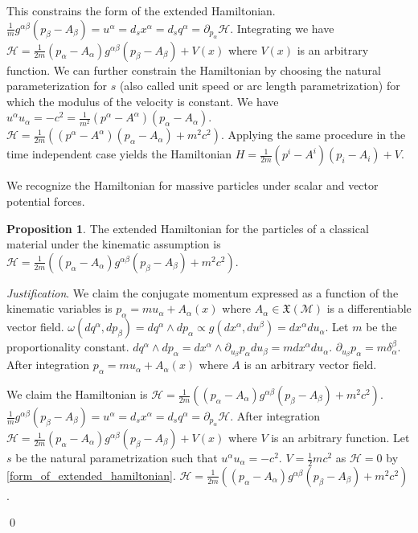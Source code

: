 \documentclass[aps,pra,10pt,twocolumn,floatfix,nofootinbib]{revtex4-1}
\numberwithin{equation}{section}
\theoremstyle{definition}
\newtheorem{prop}[equation]{Proposition}
\newenvironment{justification}{\emph{Justification}.}{\qed}
\begin{document}
This constrains the form of the extended Hamiltonian. $\frac{1}{m}g^{\alpha\beta}(p_\beta-A_\beta) = u^\alpha = d_s x^\alpha = d_s q^\alpha = \partial_{p_\alpha} \mathcal{H}$. Integrating we have $\mathcal{H}=\frac{1}{2m}(p_\alpha-A_\alpha)g^{\alpha\beta}(p_\beta-A_\beta)+V(x)$ where $V(x)$ is an arbitrary function. We can further constrain the Hamiltonian by choosing the natural parameterization for $s$ (also called unit speed or arc length parametrization) for which the modulus of the velocity is constant. We have $u^\alpha u_\alpha = - c^2 = \frac{1}{m^2}(p^\alpha-A^\alpha)(p_\alpha-A_\alpha)$. $\mathcal{H}=\frac{1}{2m}((p^\alpha-A^\alpha)(p_\alpha-A_\alpha) + m^2 c^2)$. Applying the same procedure in the time independent case yields the Hamiltonian $H=\frac{1}{2m}(p^i-A^i)(p_i-A_i)+V$.

We recognize the Hamiltonian for massive particles under scalar and vector potential forces.

\begin{prop}\label{kineticHamiltonian}
The extended Hamiltonian for the particles of a classical material under the kinematic assumption is $\mathcal{H}=\frac{1}{2m}((p_\alpha-A_\alpha)g^{\alpha\beta}(p_\beta-A_\beta) + m^2 c^2)$.
\end{prop}

\begin{justification}
	We claim the conjugate momentum expressed as a function of the kinematic variables is $p_\alpha = m u_\alpha + A_\alpha(x)$ where $A_\alpha \in \mathfrak{X}(\mathcal{M})$ is a differentiable vector field. $\omega(dq^\alpha, dp_\beta) = dq^\alpha \wedge dp_\alpha \propto g(dx^\alpha, du^\beta) = dx^\alpha du_\alpha$. Let $m$ be the proportionality constant. $dq^\alpha \wedge dp_\alpha = dx^\alpha \wedge \partial_{u_\beta} p_\alpha du_\beta = m dx^\alpha du_\alpha$. $\partial_{u_\beta} p_\alpha = m \delta_\alpha^\beta$. After integration $p_\alpha = m u_\alpha + A_\alpha(x)$ where $A$ is an arbitrary vector field.
	
	We claim the Hamiltonian is $\mathcal{H}=\frac{1}{2m}((p_\alpha-A_\alpha)g^{\alpha\beta}(p_\beta-A_\beta) + m^2 c^2)$.  $\frac{1}{m}g^{\alpha\beta}(p_\beta-A_\beta) = u^\alpha = d_s x^\alpha = d_s q^\alpha = \partial_{p_\alpha} \mathcal{H}$. After integration $\mathcal{H}=\frac{1}{2m}(p_\alpha-A_\alpha)g^{\alpha\beta}(p_\beta-A_\beta)+V(x)$ where $V$ is an arbitrary function. Let $s$ be the natural parametrization such that $u^\alpha u_\alpha = - c^2$. $V= \frac{1}{2}m c^2$ as $\mathcal{H}=0$ by \ref{form_of_extended_hamiltonian}. $\mathcal{H}=\frac{1}{2m}((p_\alpha-A_\alpha)g^{\alpha\beta}(p_\beta-A_\beta) + m^2 c^2)$.
	
\end{justification}
\end{document}
